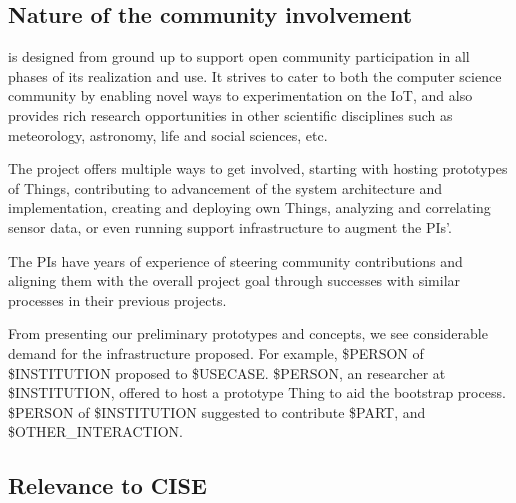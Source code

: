 \subsection{Nature of the community involvement}

\sysname is designed from ground up to support open community
participation in all phases of its realization and use.
It strives to cater to both the computer science community
by enabling novel ways to experimentation on the \acrlong{IoT},
and also provides rich research opportunities in other
scientific disciplines such as meteorology, astronomy, life and
social sciences, etc.

The project offers multiple ways to get involved, starting with
hosting prototypes of Things, contributing to advancement of the
system architecture and implementation, creating and deploying
own Things, analyzing and correlating sensor data, or even
running \sysname support infrastructure to augment the PIs'.

The PIs have years of experience of steering community contributions
and aligning them with the overall project goal through successes with
similar processes in their previous projects.

From presenting our preliminary prototypes and concepts,
we see considerable demand for the infrastructure proposed.
For example, \$PERSON of \$INSTITUTION proposed to \$USECASE.
\$PERSON, an researcher at \$INSTITUTION, offered to host
a prototype Thing to aid the bootstrap process.
\$PERSON of \$INSTITUTION suggested to contribute
\$PART, and \$OTHER\_INTERACTION.


\subsection{Relevance to CISE}

